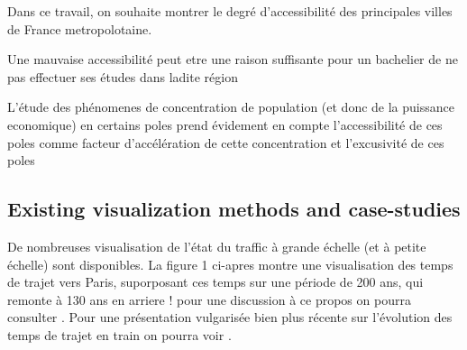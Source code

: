 \documentclass{vgtc}                          %
\begin{document}
Dans ce travail, on souhaite montrer le degré d'accessibilité des principales villes de France metropolotaine. 

Une mauvaise accessibilité peut etre une raison suffisante pour un bachelier de ne pas effectuer ses études dans ladite région



L'étude des phénomenes de concentration de population (et donc de la puissance economique) en certains poles prend évidement en compte l'accessibilité de ces poles comme facteur d'accélération de cette concentration et l'excusivité de ces poles 

\subsection{Existing visualization methods and case-studies}

\vspace{0.2cm}

De nombreuses visualisation de l'état du traffic à grande échelle (et à petite échelle) sont disponibles. La figure 1 ci-apres montre une visualisation des temps de trajet vers Paris, suporposant ces temps sur une période de 200 ans, qui remonte à 130 ans en arriere ! pour une discussion à ce propos on pourra consulter \cite{schoedon2016interactive}.  Pour une présentation vulgarisée bien plus récente sur l'évolution des temps de trajet en train on pourra voir \cite{LeMonde1}.
\end{document}
